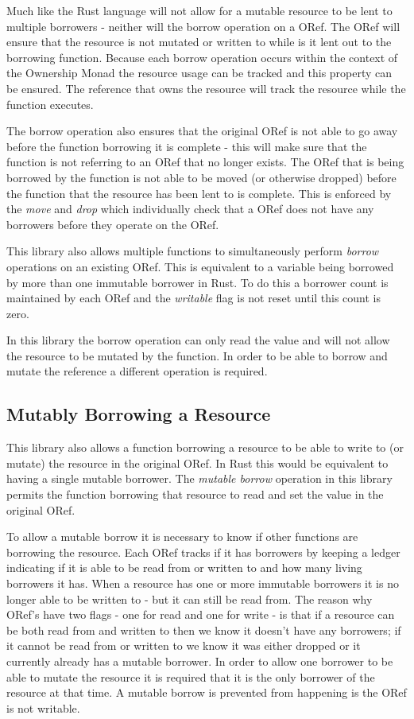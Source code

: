 \documentclass[onehalf,11pt]{beavtex}
\begin{document}
Much like the Rust language will not allow for a mutable resource to be lent to
multiple borrowers - neither will the borrow operation on a ORef.
The ORef will ensure that the resource is not mutated or written to while is it
lent out to the borrowing function. 
Because each borrow operation occurs within the context of the Ownership Monad
the resource usage can be tracked and this property can be ensured. The
reference that owns the resource will track the resource while the function
executes.

The borrow operation also ensures that the original ORef is not able to go away
before the function borrowing it is complete - this will make sure that the
function is not referring to an ORef that no longer exists.  The ORef that is
being borrowed by the function is not able to be moved (or otherwise dropped)
before the function that the resource has been lent to is complete. This is
enforced by the \textit{move} and \textit{drop} which individually check that
a ORef does not have any borrowers before they operate on the ORef.

This library also allows multiple functions to simultaneously perform
\textit{borrow} operations on an existing ORef. This is equivalent to a variable
being borrowed by more than one immutable borrower in Rust. To do this a
borrower count is maintained by each ORef and the \textit{writable} flag is not
reset until this count is zero.

In this library the borrow operation can only read the value and will not allow
the resource to be mutated by the function.  In order to be able to borrow and
mutate the reference a different operation is required.

\subsection{Mutably Borrowing a Resource}

This library also allows a function borrowing a resource to be able to
write to (or mutate) the resource in the original ORef.  In Rust this would be
equivalent to having a single mutable borrower.  The \textit{mutable borrow}
operation in this library permits the function borrowing that resource to read
and set the value in the original ORef.

To allow a mutable borrow it is necessary to know if other functions are
borrowing the resource.  Each ORef tracks if it has borrowers by keeping a
ledger indicating if it is able to be read from or written to and how many
living borrowers it has.  When a resource has one or more immutable borrowers it
is no longer able to be written to - but it can still be read from.
The reason why ORef's have two flags - one for read and one for write - is that
if a resource can be both read from and written to then we know it doesn't have
any borrowers; if it cannot be read from or written to we know it was either
dropped or it currently already has a mutable borrower.
In order to allow one borrower to be able to mutate the resource it is required
that it is the only borrower of the resource at that time. %
A mutable borrow is prevented from happening is the ORef is not writable.
\end{document}
